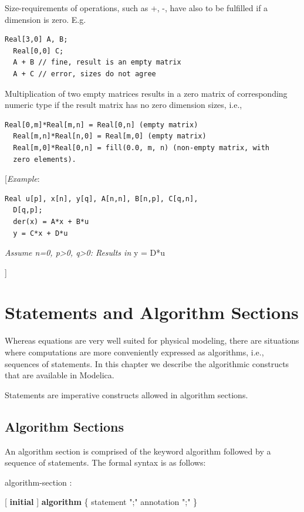 \documentclass[10pt,a4paper]{report}
\def\doublelabel#1{\label{#1}\hypertarget{#1}{}}
\begin{document}
Size-requirements of operations, such as +, -, have also to be fulfilled
if a dimension is zero. E.g.

\begin{lstlisting}[language=modelica]
  Real[3,0] A, B;
  Real[0,0] C;
  A + B // fine, result is an empty matrix
  A + C // error, sizes do not agree
\end{lstlisting}
Multiplication of two empty matrices results in a zero matrix of
corresponding numeric type if the result matrix has no zero dimension
sizes, i.e.,

\begin{lstlisting}[language=modelica]
  Real[0,m]*Real[m,n] = Real[0,n] (empty matrix)
  Real[m,n]*Real[n,0] = Real[m,0] (empty matrix)
  Real[m,0]*Real[0,n] = fill(0.0, m, n) (non-empty matrix, with
  zero elements).
\end{lstlisting}
{[}\emph{Example}:

\begin{lstlisting}[language=modelica]
  Real u[p], x[n], y[q], A[n,n], B[n,p], C[q,n],
  D[q,p];
  der(x) = A*x + B*u
  y = C*x + D*u
\end{lstlisting}
\emph{Assume n=0, p\textgreater{}0, q\textgreater{}0: Results in} y =
D*u

{]}

\chapter{Statements and Algorithm Sections}\doublelabel{statements-and-algorithm-sections}

Whereas equations are very well suited for physical modeling, there are
situations where computations are more conveniently expressed as
algorithms, i.e., sequences of statements. In this chapter we describe
the algorithmic constructs that are available in Modelica.

Statements are imperative constructs allowed in algorithm sections.

\section{Algorithm Sections}\doublelabel{algorithm-sections}

An algorithm section is comprised of the keyword algorithm followed by a
sequence of statements. The formal syntax is as follows:

algorithm-section :

{[} \textbf{initial} {]} \textbf{algorithm} \{ statement ";" \textbar{}
annotation ";" \}
\end{document}
